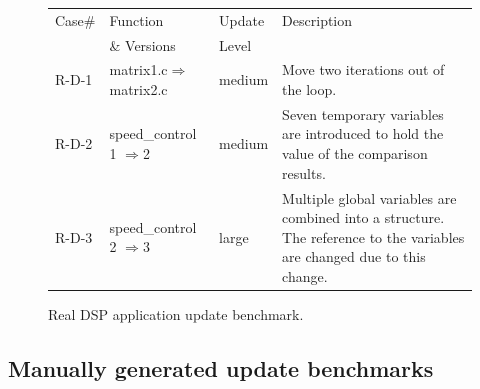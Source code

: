 \begin{figure}[htdp]
\begin{small}

\begin{center}
\begin{tabular}{||p{0.5in}|p{1.5in}|p{0.6in}|p{3.5in}||}
\hline
Case\#  &  Function & Update & Description \\
 & \& Versions &Level&\\
\hline\hline
R-D-1 &  matrix1.c$\Rightarrow$matrix2.c& medium & Move two iterations out of the loop.\\
\hline
R-D-2 &  speed\_control 1 $\Rightarrow$2 & medium &Seven temporary variables are introduced to hold the value of the comparison results.\\
\hline
R-D-3 & speed\_control 2 $\Rightarrow$3 &large &  Multiple global variables are combined into a structure. The reference to the variables are changed due to this change.\\
\hline
\end{tabular}
\end{center}
\caption{Real DSP application update benchmark. }
\label{dsp-bench}
\end{small}
\end{figure}%


\subsection{Manually generated update benchmarks}

